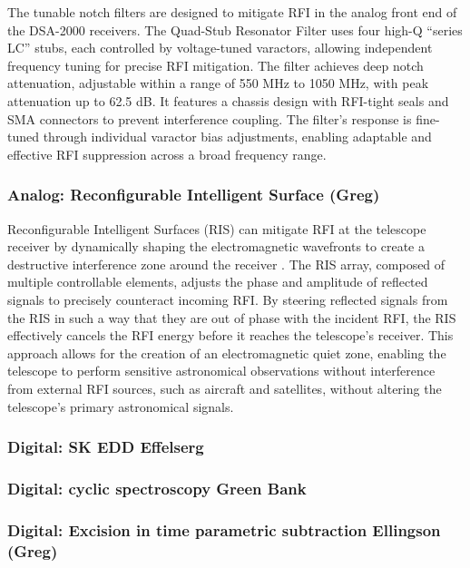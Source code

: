 The tunable notch filters are designed to mitigate RFI in the analog front end of the DSA-2000 receivers. The Quad-Stub Resonator Filter uses four high-Q “series LC” stubs, each controlled by voltage-tuned varactors, allowing independent frequency tuning for precise RFI mitigation. The filter achieves deep notch attenuation, adjustable within a range of 550 MHz to 1050 MHz, with peak attenuation up to 62.5 dB. It features a chassis design with RFI-tight seals and SMA connectors to prevent interference coupling. The filter's response is fine-tuned through individual varactor bias adjustments, enabling adaptable and effective RFI suppression across a broad frequency range.

\subsubsection{Analog: Reconfigurable Intelligent Surface (Greg)}

Reconfigurable Intelligent Surfaces (RIS) can mitigate RFI at the telescope receiver by dynamically shaping the electromagnetic wavefronts to create a destructive interference zone around the receiver \cite{zou2022scisrs,wei2024ris,wei2023multistage}. The RIS array, composed of multiple controllable elements, adjusts the phase and amplitude of reflected signals to precisely counteract incoming RFI. By steering reflected signals from the RIS in such a way that they are out of phase with the incident RFI, the RIS effectively cancels the RFI energy before it reaches the telescope’s receiver. This approach allows for the creation of an electromagnetic quiet zone, enabling the telescope to perform sensitive astronomical observations without interference from external RFI sources, such as aircraft and satellites, without altering the telescope’s primary astronomical signals.

\subsubsection{Digital: SK EDD Effelserg}
\subsubsection{Digital: cyclic spectroscopy Green Bank}

\subsubsection{Digital: Excision in time parametric subtraction Ellingson (Greg)}

